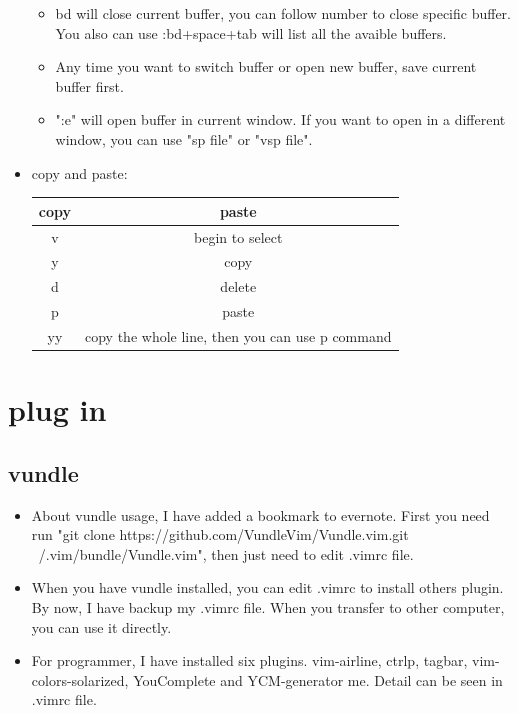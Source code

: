\documentclass[a4paper,12pt,twoside]{book}
\begin{document}
\begin{itemize}
\begin{itemize}
			\item bd will close current buffer, you can follow number to close specific buffer. You also can use :bd+space+tab will list all the avaible buffers.
			\item Any time you want to switch buffer or open new buffer, save current buffer first.
			\item ":e" will open buffer in current window. If you want to open in a different window, you can use "sp file" or "vsp file".
	\end{itemize}

    
    \item copy and paste:
    
    \begin{center}
        \begin{tabular}{c|c}
		copy & paste\\
		\hline v & begin to select\\
		y & copy\\
		d & delete\\
		p & paste \\
		yy & copy the whole line, then you can use p command  \\
		
			\end{tabular}
	\end{center}
		
\end{itemize}

\section{plug in}
\subsection{vundle}
\begin{itemize}
		\item About vundle usage, I have added a bookmark to evernote. First you need run "git clone https://github.com/VundleVim/Vundle.vim.git ~/.vim/bundle/Vundle.vim", then just need to edit .vimrc file.  

\item When you have vundle installed, you can edit .vimrc to install others plugin. By now, I have backup my .vimrc file. When you transfer to other computer, you can use it directly. 

\item For programmer, I have installed six plugins.  vim-airline, ctrlp, tagbar,  vim-colors-solarized, YouComplete and YCM-generator me. Detail can be seen in .vimrc file.
		\end{itemize}
\end{document}
